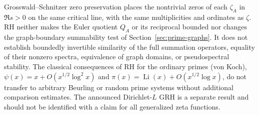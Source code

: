 \documentclass[12pt,letterpaper]{article}
\theoremstyle{remark}
\numberwithin{equation}{section}
\begin{document}
Grosswald--Schnitzer zero preservation places the nontrivial
zeros of each $\zeta_A$ in $\Re s>0$ on the same critical line,
with the same multiplicities and ordinates as $\zeta$.
RH neither makes the Euler quotient $Q_A$ or its reciprocal
bounded nor changes the graph-boundary summability test of
Section~\ref{sec:prime-graphs}.
It does not establish boundedly invertible similarity of the
full summation operators, equality of their nonzero spectra,
equivalence of graph domains, or pseudospectral stability.
The classical consequences of RH for the ordinary primes
(von Koch),
$\psi(x)=x+O(x^{1/2}\log^2x)$ and
$\pi(x)=\operatorname{Li}(x)+O(x^{1/2}\log x)$,
do not transfer to arbitrary Beurling or random prime systems
without additional comparison estimates.
The announced Dirichlet-$L$ GRH \cite{Ru26} is a separate result and
should not be identified with a claim for all generalized zeta functions.
\end{document}
